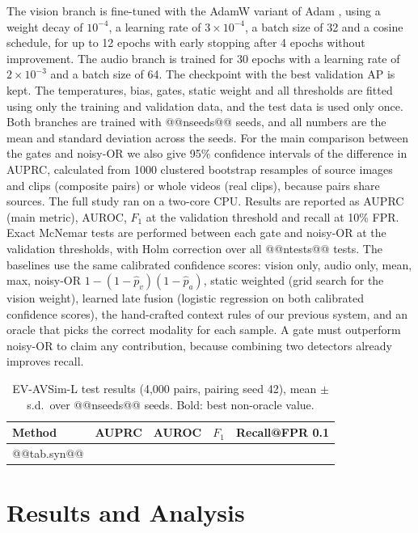 \documentclass[runningheads,a4paper]{llncs}
\begin{document}
The vision branch is fine-tuned with the AdamW variant of Adam
\cite{kingma2015}, using a weight decay of $10^{-4}$, a learning rate of
$3\times10^{-4}$, a batch size of 32 and a cosine schedule, for up to 12 epochs
with early stopping after 4 epochs without improvement. The audio branch is
trained for 30 epochs with a learning rate of $2\times10^{-3}$ and a batch
size of 64. The checkpoint with the best validation AP is kept. The
temperatures, bias, gates, static weight and all thresholds are fitted using
only the training and validation data, and the test data is used only once.
Both branches are trained with @@nseeds@@ seeds, and all numbers are the mean
and standard deviation across the seeds. For the main comparison between the
gates and noisy-OR we also give 95\% confidence intervals of the difference in
AUPRC, calculated from 1000 clustered bootstrap resamples \cite{efron1993} of
source images and clips (composite pairs) or whole videos (real clips),
because pairs share sources. The full
study ran on a two-core CPU. Results are reported as AUPRC (main metric), AUROC, $F_1$ at
the validation threshold and recall at 10\% FPR. Exact McNemar tests
\cite{dietterich1998} are performed between each gate and noisy-OR at the
validation thresholds, with Holm correction over all @@ntests@@ tests. The
baselines use the same calibrated confidence scores: vision only, audio only,
mean, max, noisy-OR $1-(1-\hat p_v)(1-\hat p_a)$, static weighted (grid search
for the vision weight), learned late fusion (logistic regression on both
calibrated confidence scores), the hand-crafted context rules of our previous
system, and an oracle that picks the correct modality for each sample. A gate
must outperform noisy-OR to claim any contribution, because combining two
detectors already improves recall.

\begin{table}[htbp]
\centering
\caption{EV-AVSim-L test results (4,000 pairs, pairing seed 42), mean $\pm$
s.d.\ over @@nseeds@@ seeds. Bold: best non-oracle value.}
\label{tab:main}
\scriptsize
\setlength{\tabcolsep}{5pt}
\begin{tabular}{lcccc}
\toprule
Method & AUPRC & AUROC & $F_1$ & Recall@FPR 0.1 \\
\midrule
@@tab.syn@@
\bottomrule
\end{tabular}
\end{table}

\section{Results and Analysis}
\label{sec:results}
\end{document}
